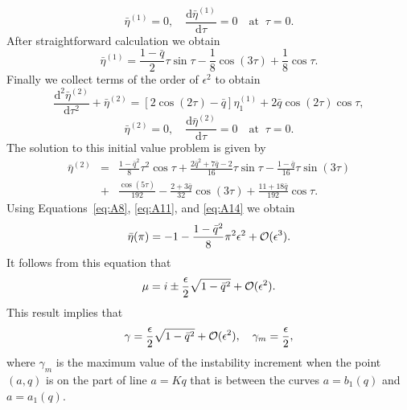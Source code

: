\documentclass[12pt]{ociamthesis}
\begin{document}
% 
\begin{equation}
\bar\eta^{(1)} = 0, \quad \frac{\mathrm{d}\bar\eta^{(1)}}{\mathrm{d}\tau} = 0 
   \quad \mbox{at} \;\; \tau = 0.
\label{eq:A10}
\end{equation}
%
After straightforward calculation we obtain
% 
\begin{equation}
\bar\eta^{(1)} = \frac{1 - \bar q}2\tau\sin\tau - \frac18\cos(3\tau) + \frac18\cos\tau.
\label{eq:A11}
\end{equation}
%
Finally we collect terms of the order of $\epsilon^2$ to obtain
%
\begin{equation}
\frac{\mathrm{d}^2\bar\eta^{(2)}}{\mathrm{d}\tau^2} + \bar\eta^{(2)} = 
   [2\cos(2\tau) - \bar q]\eta_1^{(1)} + 2\bar q\cos(2\tau)\cos\tau,
\label{eq:A12} 
\end{equation}
% 
\begin{equation}
\bar\eta^{(2)} = 0, \quad \frac{\mathrm{d}\bar\eta^{(2)}}{\mathrm{d}\tau} = 0 
   \quad \mbox{at} \;\; \tau = 0.
\label{eq:A13}
\end{equation}
%
The solution to this initial value problem is given by
% 
\begin{eqnarray}
\bar\eta^{(2)} &=& \frac{1 - \bar q^2}8\tau^2\cos\tau + 
   \frac{2\bar q^2 + 7\bar q -2}{16}\tau\sin\tau - 
   \frac{1 - \bar q}{16}\tau\sin(3\tau) \nonumber\\ 
&+& \frac{\cos(5\tau)}{192} - \frac{2 + 3\bar q}{32}\cos(3\tau) + 
   \frac{11 + 18\bar q}{192}\cos\tau.
\label{eq:A14}
\end{eqnarray}
%
Using Equations~\eqref{eq:A8}, \eqref{eq:A11}, and \eqref{eq:A14} we obtain
% 
\begin{equation}
\bar\eta(\pi) = -1 - \frac{1 - \bar q^2}8\pi^2\epsilon^2 + {\cal O}(\epsilon^3).
\label{eq:A15}
\end{equation}
%
It follows from this equation that 
% 
\begin{equation}
\mu = i \pm \frac\epsilon2\sqrt{1 - \bar q^2} + {\cal O}(\epsilon^2).
\label{eq:A16}
\end{equation}
%
This result implies that
% 
\begin{equation}
\gamma = \frac\epsilon2\sqrt{1 - \bar q^2} + {\cal O}(\epsilon^2), \quad
   \gamma_m = \frac\epsilon2 ,
\label{eq:A17}
\end{equation}
%
where $\gamma_m$ is the maximum value of the instability increment when the point $(a,q)$ is on the part of line $a = Kq$ that is between the curves $a = b_1(q)$ and $a = a_1(q)$.
\end{document}
